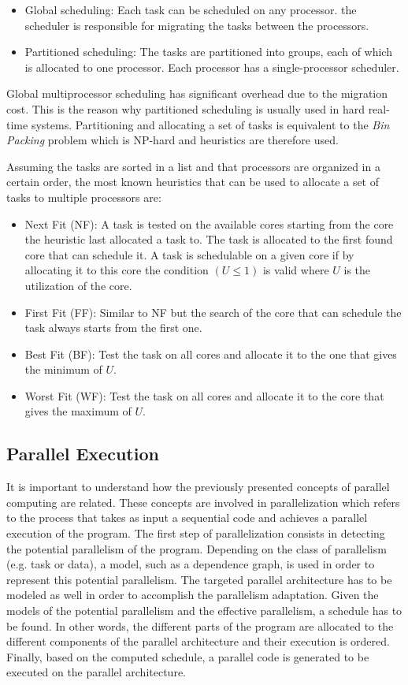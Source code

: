 \begin{itemize}
\item Global scheduling: Each task can be scheduled on any processor. the scheduler is responsible for migrating the tasks between the processors.
\item Partitioned scheduling: The tasks are partitioned into groups, each of which is allocated to one processor. Each processor has a single-processor scheduler. 
\end{itemize}
Global multiprocessor scheduling has significant overhead due to the migration cost. This is the reason why partitioned scheduling is usually used in hard real-time systems. Partitioning and allocating a set of tasks is equivalent to the \textit{Bin Packing} problem which is NP-hard and heuristics are therefore used. 

Assuming the tasks are sorted in a list and that processors are organized in a certain order, the most known heuristics that can be used to allocate a set of tasks to multiple processors are:

\begin{itemize}
\item Next Fit (NF): A task is tested on the available cores starting from the core the heuristic last allocated a task to. The task is allocated to the first found core that can schedule it. A task is schedulable on a given core if by allocating it to this core the condition $(U\leq1)$ is valid where $U$ is the utilization of the core.
\item First Fit (FF): Similar to NF but the search of the core that can schedule the task always starts from the first one.
\item Best Fit (BF): Test the task on all cores and allocate it to the one that gives the minimum of $U$.
\item Worst Fit (WF): Test the task on all cores and allocate it to the core that gives the maximum of $U$.
\end{itemize}
  
\subsection{Parallel Execution}

It is important to understand how the previously presented concepts of parallel computing are related. These concepts are involved in parallelization which refers to the process that takes as input a sequential code and achieves a parallel execution of the program. The first step of parallelization consists in detecting the potential parallelism of the program. Depending on the class of parallelism (e.g. task or data), a model, such as a dependence graph, is used in order to represent this potential parallelism. The targeted parallel architecture has to be modeled as well in order to accomplish the parallelism adaptation. Given the models of the potential parallelism and the effective parallelism, a schedule has to be found. In other words, the different parts of the program are allocated to the different components of the parallel architecture and their execution is ordered. Finally, based on the computed schedule, a parallel code is generated to be executed on the parallel architecture.  

